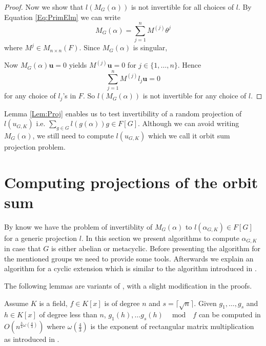 \documentclass[sigconf]{acmart}
\newcommand{\osum}[2]{\alpha_{#1,#2}}
\theoremstyle{acmplain}
\begin{document}
\begin{proof}
 
 Now we show that $l(M_G(\alpha))$ is not invertible for all
 choices of $l$. By Equation \ref{Eq:PrimElm} we can write 
 $$M_G(\alpha) = \sum_{j = 1}^n M^{(j)} \theta^j$$ 
 where $M^{j} \in M_{n \times n}(F)$. Since $M_G(\alpha)$ is singular, 
 
 Now $M_G(\alpha) \textbf{u} =0$ yields $M^{(j)}\textbf{u} = 0$ for $j \in \lbrace 1, \ldots , n \rbrace$. Hence
 $$\sum_{j = 1}^n M^{(j)} l_j \textbf{u} = 0$$ for any choice of $l_j$'s in $F$. So $l(M_G(\alpha))$ is not invertible for any choice of $l$.
\end{proof} 
Lemma \ref{Lem:Proj} enables us to test invertibility of a random projection of $l(u_{G,K}) $ i.e. $\sum_{g \in G}
 l(g(\alpha))g \in F[G]$. Although we can avoid writing $M_G(\alpha)$, we still need to compute $l(u_{G,K})$ which
 we call it orbit sum projection problem.


\section{Computing projections of the orbit sum}\label{sec:osum}

By know we have the problem of invertiblity of $M_G(\alpha)$ to $l(\osum{G}{K}) \in F[G]$ for a generic
projection $l$. In this section we present algorithms to compute $\alpha_{G,K}$ in case that $G$ is either abelian or metacyclic. 
Before presenting the algorithm for the mentioned groups we need to provide some tools. Afterwards we explain an algorithm
for a cyclic extension which is similar to the algorithm introduced in \cite{Kaltofen}.

The following lemmas are variants of \cite[Lemma 3 $\&$ Lemma 4]{Kaltofen}, with a slight modification in the proofs.

\begin{lemma}\cite{Kaltofen}\label{modcom}
Assume $K$ is a field, $f\in K[x]$ is of degree $n$ and $s = \lceil\sqrt{n}\rceil$. Given $g_1, \ldots , g_{s}$ and 
$h \in K[x]$ of degree less than $n$, $g_1(h), \ldots g_{s}(h)\,\,\,\mod\,\,\, f$ can be computed in
$O(n^{\frac{3}{4}\omega(\frac{4}{3})})$ where $\omega(\frac{4}{3})$ is the exponent of rectangular matrix 
multiplication as introduced in \cite{LeGall}. 
\end{lemma}
\end{document}
